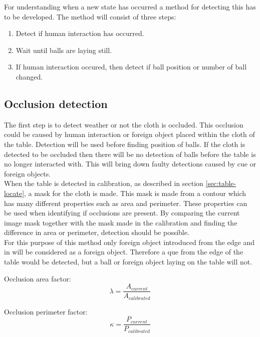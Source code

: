 For understanding when a new state has occurred a method for detecting this has to be developed. The method will consist of three steps:
\begin{enumerate}
	\item Detect if human interaction has occurred.
	\item Wait until balls are laying still.
	\item If human interaction occured, then detect if ball position or number of ball changed.
\end{enumerate}

\subsection{Occlusion detection}
The first step is to detect weather or not the cloth is occluded. This occlusion could be caused by human interaction or foreign object placed within the cloth of the table. Detection will be used before finding position of balls. If the cloth is detected to be occluded then there will be no detection of balls before the table is no longer interacted with. This will bring down faulty detections caused by cue or foreign objects.\\

When the table is detected in calibration, as described in section \ref{sec:table-locate}, a mask for the cloth is made. This mask is made from a contour which has many different properties such as area and perimeter. These properties can be used when identifying if occlusions are present. By comparing the current image mask together with the mask made in the calibration and finding the difference in area or perimeter, detection should be possible.\\

For this purpose of this method only foreign object introduced from the edge and in will be considered as a foreign object. Therefore a que from the edge of the table would be detected, but a ball or foreign object laying on the table will not.

Occlusion area factor:
\begin{equation}
\lambda = \frac{A_{current}}{A_{calibrated}}
\label{eq:area}
\end{equation}

Occlusion perimeter factor:
\begin{equation}
\kappa = \frac{P_{current}}{P_{calibrated}}
\label{eq:perimeter}
\end{equation}

